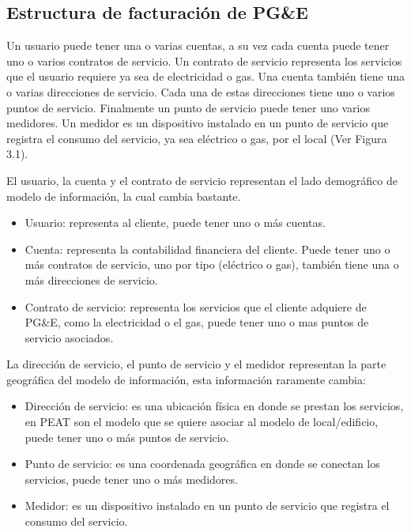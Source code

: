 \subsection{Estructura de facturación de PG\&E}
Un usuario puede tener una o varias cuentas, a su vez cada cuenta puede tener uno o varios
contratos de servicio. Un contrato de servicio representa los servicios que el usuario
requiere ya sea de electricidad o gas. Una cuenta también tiene una o varias direcciones de
servicio.
Cada una de estas direcciones tiene uno o varios puntos de servicio. Finalmente un punto
de servicio puede tener uno varios medidores. Un medidor es un dispositivo instalado en un
punto de servicio que registra el consumo del servicio, ya sea eléctrico o gas, por el local
(Ver Figura 3.1).


El usuario, la cuenta y el contrato de servicio representan el lado demográfico de modelo de
información, la cual cambia bastante.

\begin{itemize}
\item Usuario: representa al cliente, puede tener uno o más cuentas.
\item Cuenta: representa la contabilidad financiera del cliente. Puede
  tener uno o más contratos de servicio, uno por tipo (eléctrico o gas),
  también tiene una o más direcciones de servicio.
\item Contrato de servicio: representa los servicios que el cliente adquiere
  de PG\&E, como la electricidad o el gas, puede tener uno o mas puntos
  de servicio asociados.
\end{itemize}

La dirección de servicio, el punto de servicio y el medidor representan la parte geográfica
del modelo de información, esta información raramente cambia:

\begin{itemize}
\item Dirección de servicio: es una ubicación física en donde se prestan los servicios, en
  PEAT son el modelo que se quiere asociar al modelo de local/edificio, puede tener
  uno o más puntos de servicio.
\item Punto de servicio: es una coordenada geográfica en donde se conectan los servicios,
  puede tener uno o más medidores.
\item Medidor: es un dispositivo instalado en un punto de servicio que registra el
  consumo del servicio.
\end{itemize}


